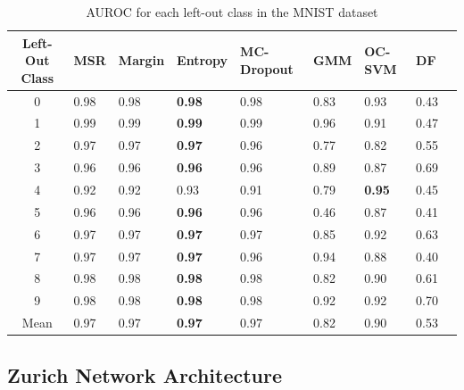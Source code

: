 \documentclass[10pt]{article}
\begin{document}
\begin{table}[H]
    \centering
    \begin{tabular}{@{}cllllllll@{}}
    \toprule
    Left-Out Class & \gls{MSR}  & Margin & Entropy & \gls{MC-Dropout} & \gls{GMM}  & \gls{OC-SVM}  & \gls{DF}                 \\ \midrule
    0              & 0.98 & 0.98 & \textbf{0.98}& 0.98 & 0.83 & 0.93 & 0.43 \\
    1              & 0.99 & 0.99 & \textbf{0.99}& 0.99 & 0.96 & 0.91 & 0.47\\
    2              & 0.97 & 0.97 & \textbf{0.97} & 0.96 & 0.77 & 0.82 & 0.55 \\
    3              & 0.96 & 0.96 & \textbf{0.96} & 0.96 & 0.89 & 0.87 & 0.69 \\
    4              & 0.92 & 0.92 & 0.93 & 0.91 & 0.79 & \textbf{0.95} & 0.45\\
    5              & 0.96 & 0.96 & \textbf{0.96} & 0.96 & 0.46 & 0.87 & 0.41 \\
    6              & 0.97 & 0.97 & \textbf{0.97} & 0.97 & 0.85 & 0.92 & 0.63\\
    7              & 0.97 & 0.97 & \textbf{0.97} & 0.96 & 0.94 & 0.88 & 0.40\\
    8              & 0.98 & 0.98 & \textbf{0.98} & 0.98 & 0.82 & 0.90 & 0.61\\
    9              & 0.98 & 0.98 & \textbf{0.98} & 0.98 & 0.92 & 0.92 & 0.70 \\\midrule
    Mean           & 0.97 & 0.97 & \textbf{0.97} & 0.97 & 0.82 & 0.90 & 0.53 \\\bottomrule
    \end{tabular}
    \caption{\gls{AUROC} for each left-out class in the \gls{MNIST} dataset}
    \label{table:mnist-auroc-nd}
\end{table}


\subsection{Zurich Network Architecture}
\end{document}

